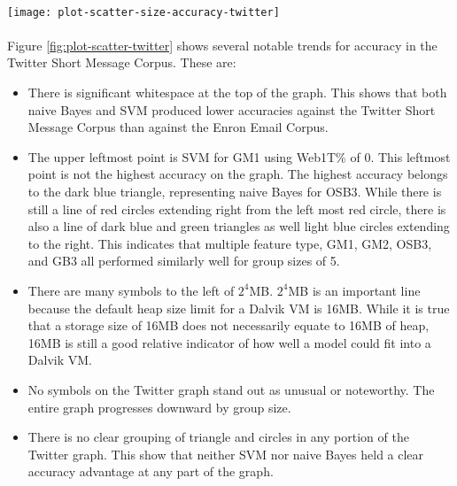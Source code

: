 \paragraph*{}
	\begin{sidewaysfigure}[htbp!]
		\begin{center}
		\centering
		\texttt{[image: plot-scatter-size-accuracy-twitter]}
		\caption{Scatter-Plot of Twitter Short Message Corpus Tests}
		\label{fig:plot-scatter-twitter}
		\end{center}
	\end{sidewaysfigure}

\paragraph*{} Figure \ref{fig:plot-scatter-twitter} shows several notable trends for accuracy in the Twitter Short Message Corpus.  These are:
	\begin{itemize}
		\item There is significant whitespace at the top of the graph.  This shows that both naive Bayes and SVM produced lower accuracies against the Twitter Short Message Corpus than against the Enron Email Corpus.
		\item The upper leftmost point is SVM for GM1 using Web1T\% of 0.  This leftmost point is not the highest accuracy on the graph.  The highest accuracy belongs to the dark blue triangle, representing naive Bayes for OSB3.  While there is still a line of red circles extending right from the left most red circle, there is also a line of dark blue and green triangles as well light blue circles extending to the right.  This indicates that multiple feature type, GM1, GM2, OSB3, and GB3 all performed similarly well for group sizes of 5.
		\item There are many symbols to the left of $2^4$MB. $2^4$MB is an important line because the default heap size limit for a Dalvik VM is 16MB.  While it is true that a storage size of 16MB does not necessarily equate to 16MB of heap, 16MB is still a good relative indicator of how well a model could fit into a Dalvik VM.
		\item No symbols on the Twitter graph stand out as unusual or noteworthy.  The entire graph progresses downward by group size.
		\item There is no clear grouping of triangle and circles in any portion of the Twitter graph. This show that neither SVM nor naive Bayes held a clear accuracy advantage at any part of the graph.
		
	\end{itemize}

